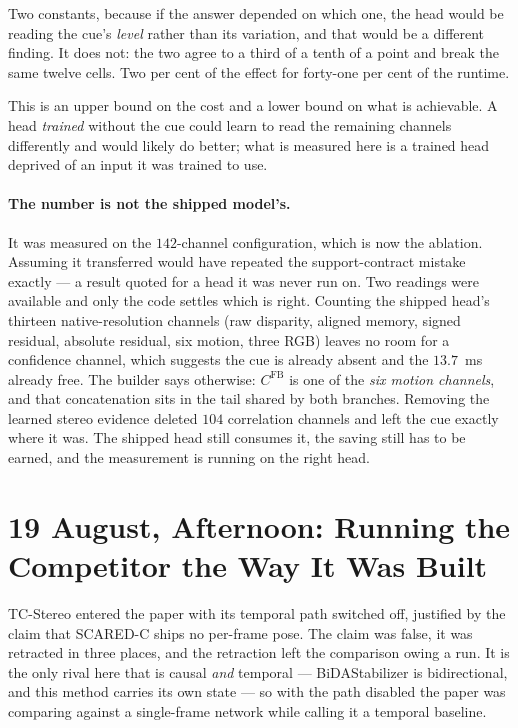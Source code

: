 \documentclass[11pt,a4paper]{article}
\begin{document}
Two constants, because if the answer depended on which one, the head would be reading
the cue's \emph{level} rather than its variation, and that would be a different
finding. It does not: the two agree to a third of a tenth of a point and break the
same twelve cells. Two per cent of the effect for forty-one per cent of the runtime.

This is an upper bound on the cost and a lower bound on what is achievable. A head
\emph{trained} without the cue could learn to read the remaining channels differently
and would likely do better; what is measured here is a trained head deprived of an
input it was trained to use.

\paragraph{The number is not the shipped model's.} It was measured on the
$142$-channel configuration, which is now the ablation. Assuming it transferred would
have repeated the support-contract mistake exactly --- a result quoted for a head it
was never run on. Two readings were available and only the code settles which is
right. Counting the shipped head's thirteen native-resolution channels (raw
disparity, aligned memory, signed residual, absolute residual, six motion, three RGB)
leaves no room for a confidence channel, which suggests the cue is already absent and
the $13.7$~ms already free. The builder says otherwise: $C^{\mathrm{FB}}$ is one of
the \emph{six motion channels}, and that concatenation sits in the tail shared by
both branches. Removing the learned stereo evidence deleted $104$ correlation
channels and left the cue exactly where it was. The shipped head still consumes it,
the saving still has to be earned, and the measurement is running on the right head.

\section*{19 August, Afternoon: Running the Competitor the Way It Was Built}

TC-Stereo entered the paper with its temporal path switched off, justified by the
claim that SCARED-C ships no per-frame pose. The claim was false, it was retracted in
three places, and the retraction left the comparison owing a run. It is the only
rival here that is causal \emph{and} temporal --- BiDAStabilizer is bidirectional,
and this method carries its own state --- so with the path disabled the paper was
comparing against a single-frame network while calling it a temporal baseline.
\end{document}

